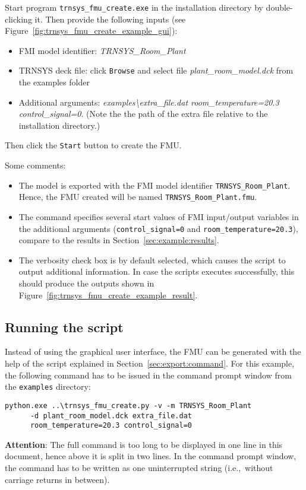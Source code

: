 Start program \texttt{trnsys\_fmu\_create.exe} in the installation directory by double-clicking it.
Then provide the following inputs (see Figure~\ref{fig:trnsys_fmu_create_example_gui}):
\begin{itemize}

  \item FMI model identifier: \textit{TRNSYS\_Room\_Plant}

  \item TRNSYS deck file: click \texttt{Browse} and select file \textit{plant\_room\_model.dck} from the examples folder

  \item Additional arguments: \textit{examples{\textbackslash}extra\_file.dat room\_temperature=20.3 control\_signal=0}. 
  (Note the the path of the extra file relative to the installation directory.)

\end{itemize}
Then click the \texttt{Start} button to create the FMU.


Some comments:
\begin{itemize}

  \item The model is exported with the FMI model identifier \verb!TRNSYS_Room_Plant!.
  Hence, the FMU created will be named \verb!TRNSYS_Room_Plant.fmu!.

  \item The command specifies several start values of FMI input/output variables in the additional arguments (\verb!control_signal=0! and \verb!room_temperature=20.3!), compare to the results in Section~\ref{sec:example:results}.
  
  \item The verbosity check box is by default selected, which  causes the script to output additional information.
  In case the scripts executes successfully, this should produce the outputs shown in Figure~\ref{fig:trnsys_fmu_create_example_result}.

\end{itemize}


\subsection{Running the \python script}

Instead of using the graphical user interface, the FMU can be generated with the help of the \python script explained in Section~\ref{sec:export:command}.
For this example, the following command has to be issued in the command prompt window from the \texttt{examples} directory:
\begin{verbatim}
python.exe ..\trnsys_fmu_create.py -v -m TRNSYS_Room_Plant
      -d plant_room_model.dck extra_file.dat
      room_temperature=20.3 control_signal=0
\end{verbatim}
\textbf{Attention}:
The full command is too long to be displayed in one line in this document, hence above it is split in two lines.
In the command prompt window, the command has to be written as one uninterrupted string (i.e.,~without carriage returns \keys{\return} in between).

